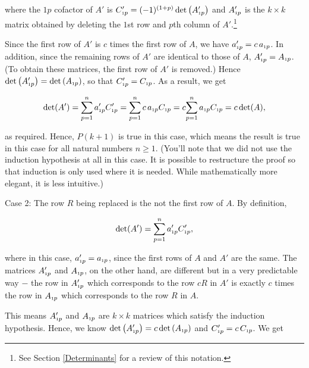 \documentclass{ximera}
\begin{document}
\begin{example}
\begin{enumerate}
where the $1p$ cofactor of $A'$ is $C'_{\mbox{\tiny$1$}p} = (-1)^{(1+p)} \det\left(A'_{\mbox{\tiny$1$}p}\right)$ and $A'_{\mbox{\tiny$1$}p}$ is the $k \times k$ matrix obtained by deleting the $1$st row and $p$th column of $A'$.\footnote{See Section \ref{Determinants} for a review of this notation.} 

\smallskip

Since the first row of $A'$ is $c$ times the first row of $A$,  we have $a'_{\mbox{\tiny$1$}p} = c \, a_{\mbox{\tiny$1$}p}$.  In addition, since the remaining rows of $A'$ are identical to those of $A$, $A'_{\mbox{\tiny$1$}p} = A_{\mbox{\tiny$1$}p}$.  (To obtain these matrices, the first row of $A'$ is removed.)  Hence $\det\left(A'_{\mbox{\tiny$1$}p}\right) = \det\left(A_{\mbox{\tiny$1$}p}\right)$, so that $C'_{\mbox{\tiny$1$}p} = C_{\mbox{\tiny$1$}p}$.  As a result, we get

\[ \det(A') = \displaystyle{\sum_{p=1}^{n} a'_{\mbox{\tiny$1$}p} C'_{\mbox{\tiny$1$}p}} = \displaystyle{\sum_{p=1}^{n} c \, a_{\mbox{\tiny$1$}p} C_{\mbox{\tiny$1$}p}} = c \displaystyle{\sum_{p=1}^{n} a_{\mbox{\tiny$1$}p} C_{\mbox{\tiny$1$}p}} = c \det(A), \]

as required.  Hence, $P(k+1)$ is true in this case, which means the result is true in this case for all natural numbers $n \geq 1$. (You'll note that we did not use the induction hypothesis at all in this case.  It is possible to restructure the proof so that induction is only used where it is needed.  While mathematically more elegant, it is less intuitive.)

{\sc Case 2:} The row $R$ being replaced is the not the first row of $A$.  By definition,

\[ \det(A') = \displaystyle{\sum_{p=1}^{n} a'_{\mbox{\tiny$1$}p} C'_{\mbox{\tiny$1$}p}},\]

where in this case, $a'_{\mbox{\tiny$1$}p} = a_{\mbox{\tiny$1$}p}$, since the first rows of $A$ and $A'$ are the same. The matrices $A'_{\mbox{\tiny$1$}p}$ and $A_{\mbox{\tiny$1$}p}$, on the other hand, are different but in a very predictable way $-$ the row in $A'_{\mbox{\tiny$1$}p}$ which corresponds to the row $cR$ in $A'$ is exactly $c$ times the row in $A_{\mbox{\tiny$1$}p}$ which corresponds to the row $R$ in $A$. 

\smallskip

This means $A'_{\mbox{\tiny$1$}p}$ and $A_{\mbox{\tiny$1$}p}$ are $k \times k$ matrices which satisfy the induction hypothesis.  Hence, we know $\det\left(A'_{\mbox{\tiny$1$}p}\right) = c \det\left(A_{\mbox{\tiny$1$}p}\right)$ and $C'_{\mbox{\tiny$1$}p} = c \, C_{\mbox{\tiny$1$}p}$.  We get


\end{enumerate}
\end{example}
\end{document}
